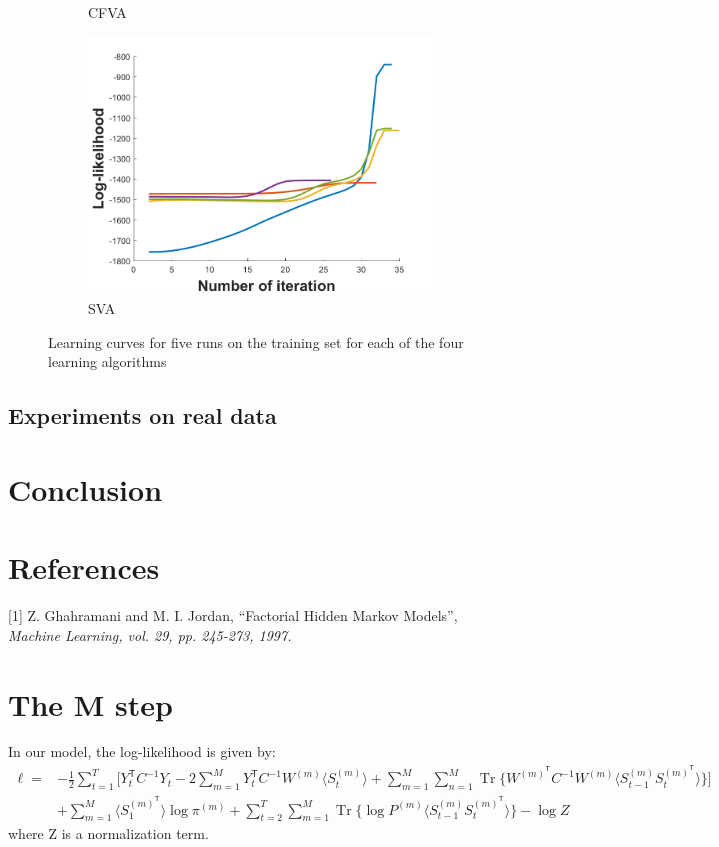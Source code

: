 \documentclass{article}
\DeclareMathOperator{\Tr}{Tr}
\begin{document}
\begin{figure}
\begin{subfigure}[b]{0.5\linewidth}
    \caption{CFVA} 
  \end{subfigure}%
  \begin{subfigure}[b]{0.5\linewidth}
    \centering
    \includegraphics[width=0.75\linewidth]{init_sva.png} 
    \caption{SVA} 
  \end{subfigure} 
  \caption{Learning curves for five runs on the training set for each of the four learning algorithms}
  \label{fig4} 
\end{figure}

\subsection{Experiments on real data}

\section{Conclusion}

\section*{References}

\small

[1] Z. Ghahramani and M. I. Jordan, ``Factorial Hidden Markov Models'', \it{Machine Learning}, vol. 29, pp. 245-273, 1997.

\appendix

\section{The M step}

In our model, the log-likelihood is given by:
\begin{align*}
\ell = &-\frac{1}{2} \sum_{t=1}^T \Bigg[Y_t^\mathsf{T} C^{-1} Y_t - 2 \sum_{m=1}^M Y_t^\mathsf{T} C^{-1} W^{(m)} \langle S_t^{(m)} \rangle + \sum_{m=1}^M \sum_{n=1}^M \Tr\bigg\{ W^{(m)^\mathsf{T}} C^{-1} W^{(m)} \langle S_{t-1}^{(m)} S_{t}^{(m)^\mathsf{T}} \rangle \bigg\} \Bigg] \\
&+ \sum_{m=1}^M \langle S_1^{(m)^\mathsf{T}} \rangle \log \pi^{(m)} + \sum_{t=2}^T \sum_{m=1}^M \Tr\Big\{ \log P^{(m)} \langle S_{t-1}^{(m)} S_{t}^{(m)^\mathsf{T}} \rangle \Big\} - \log Z
\end{align*} 
where Z is a normalization term.
\end{document}

